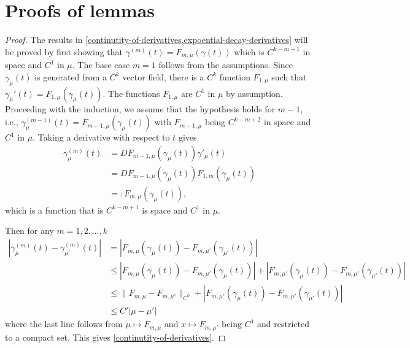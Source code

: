 \chapter{Proofs of lemmas}\label{lemma-appendix}
\heteroclinicorbitsobolev*
\begin{proof}
	The results in \cref{continutity-of-derivatives,expoential-decay-derivatives} will be proved by first showing that \(\gamma^{(m)}(t) = F_{m,\mu}(\gamma(t))\) which is \(C^{k-m+1}\) in space and \(C^1\) in \(\mu\). The base case \(m = 1\) follows from the assumptions. Since \(\gamma_\mu(t)\) is generated from a \(C^k\) vector field, there is a \(C^{k}\) function \(F_{1,\mu}\) such that \(\gamma_\mu'(t) = F_{1,\mu}(\gamma_\mu(t))\). The functions \(F_{1,\mu}\) are \(C^1\) in \(\mu\) by assumption. Proceeding with the induction, we assume that the hypothesis holds for \(m - 1\), i.e., \(\gamma^{(m-1)}_\mu(t) = F_{m-1,\mu}(\gamma_\mu(t))\) with \(F_{m-1,\mu}\) being \(C^{k-m + 2}\) in space and \(C^1\) in \(\mu\). Taking a derivative with respect to \(t\) gives
	\begin{equation}
		\begin{aligned}
			\gamma^{(m)}_\mu (t) &= DF_{m-1,\mu} (\gamma_\mu(t)) \gamma'_\mu(t) \\
			&= DF_{m-1,\mu} (\gamma_\mu(t)) F_{1,m}(\gamma_\mu(t)) \\
			&=: F_{m,\mu}(\gamma_\mu(t)),
		\end{aligned}
	\end{equation}
	which is a function that is \(C^{k-m+1}\) is space and \(C^1\) in \(\mu\).
	
	Then for any \(m =1,2,\ldots, k\)
	\begin{equation}
	\begin{aligned}
			|\gamma^{(m)}_\mu(t) - \gamma^{(m)}_{\mu'}(t)| &= |F_{m,\mu}(\gamma_\mu(t)) - F_{m,\mu'} (\gamma_{\mu'} (t)) | \\
			&\leq |F_{m,\mu}(\gamma_\mu(t)) - F_{m,\mu'} (\gamma_{\mu} (t)) | + |F_{m,\mu'}(\gamma_\mu(t)) - F_{m,\mu'} (\gamma_{\mu'} (t)) | \\
			&\leq \| F_{m,\mu} - F_{m,\mu'} \|_{C^0} + |F_{m,\mu'}(\gamma_\mu(t)) - F_{m,\mu'} (\gamma_{\mu'} (t)) | \\
			&\leq C' |\mu - \mu'|
	\end{aligned}
	\end{equation}
	where the last line follows from \(\mu \mapsto F_{m,\mu}\) and \(x\mapsto F_{m,\mu'}\) being \(C^1\) and restricted to a compact set. This gives \cref{continutity-of-derivatives}.
	

\end{proof}
